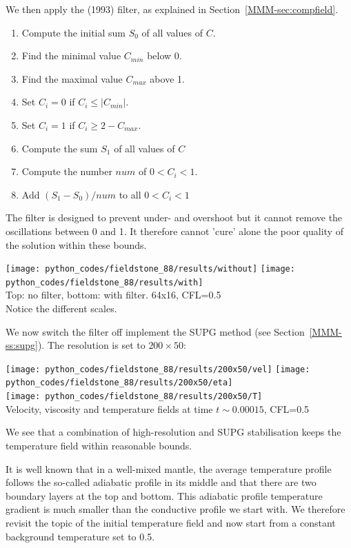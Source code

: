 We then apply the \textcite{leka93} (1993) filter, as explained 
in Section~\ref{MMM-sec:compfield}.
\begin{enumerate}
\item Compute the initial sum $S_0$ of all values of $C$.
\item Find the minimal value $C_{min}$ below 0.
\item Find the maximal value $C_{max}$ above 1.
\item Set $C_i=0$ if $C_i \leq |C_{min}|$.
\item Set $C_i=1$ if $C_i \geq 2-C_{max}$. 
\item Compute the sum $S_1$ of all values of $C$
\item Compute the number $num$ of $0 < C_i < 1$.
\item Add $(S_1-S_0)/num$ to all $0<C_i<1$
\end{enumerate}

The filter is designed to prevent under- and overshoot but it cannot remove the oscillations between 0 and 1.
It therefore cannot 'cure' alone the poor quality of the solution within these bounds.
\begin{center}
\texttt{[image: python\_codes/fieldstone\_88/results/without]}
\texttt{[image: python\_codes/fieldstone\_88/results/with]}\\
{\captionfont Top: no filter, bottom: with filter. 64x16, CFL=0.5\\ Notice the different scales.}
\end{center}

We now switch the filter off implement the SUPG method (see Section~\ref{MMM-ss:supg}). 
The resolution is set to $200 \times 50$:
\begin{center}
\texttt{[image: python\_codes/fieldstone\_88/results/200x50/vel]}
\texttt{[image: python\_codes/fieldstone\_88/results/200x50/eta]}\\
\texttt{[image: python\_codes/fieldstone\_88/results/200x50/T]}\\
{\captionfont Velocity, viscosity and temperature fields at time $t\sim 0.00015$, CFL=0.5} 
\end{center}
We see that a combination of high-resolution and SUPG stabilisation keeps the 
temperature field within reasonable bounds. 


It is well known that in a well-mixed mantle, the average temperature profile 
follows the so-called adiabatic profile in its middle and that there are two 
boundary layers at the top and bottom. This adiabatic profile temperature gradient 
is much smaller than the conductive profile we start with.
We therefore revisit the topic of the initial temperature field and now start 
from a constant background temperature set to 0.5. 

